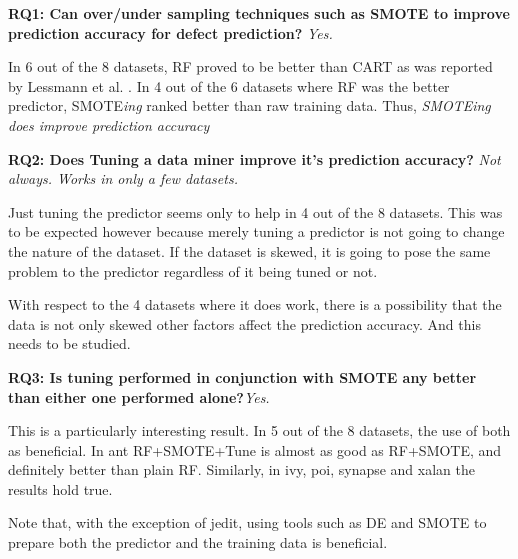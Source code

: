 \documentclass[12pt]{IEEEtran}
\begin{document}
{\textbf{RQ1:  Can over/under sampling techniques such as SMOTE to improve prediction accuracy for defect prediction?} \textit{Yes.}}

In 6 out of the 8 datasets, RF proved to be better than CART as was reported by Lessmann et al. \cite{lessmann}.
In 4 out of the 6 datasets where RF was the better predictor, SMOTE\textit{ing} ranked better than raw training data. Thus, \textit{SMOTEing does improve prediction accuracy} 

{{\bfseries RQ2: Does Tuning a data miner improve it's prediction accuracy?} \textit{Not always. Works in only a few datasets.}}


Just tuning the predictor seems only to help in 4 out of the 8 datasets. This was to be expected however because merely tuning a predictor is not going to change the nature of the dataset. If the dataset is skewed, it is going to pose the same problem to the predictor regardless of it being tuned or not. 

With respect to the 4 datasets where it does work, there is a possibility that the data is not only skewed other factors affect the prediction accuracy. And this needs to be studied.

{{\bfseries RQ3: Is tuning performed in conjunction with SMOTE any better than either one performed alone?}\textit{Yes.}}

This is a particularly interesting result. In 5 out of the 8 datasets, the use of both as beneficial. In ant RF+SMOTE+Tune is almost as good as RF+SMOTE, and definitely better than plain RF. Similarly, in ivy, poi, synapse and xalan the results hold true. 

Note that, with the exception of jedit, using tools such as DE and SMOTE to prepare both the predictor and the training data is beneficial.
\end{document}
